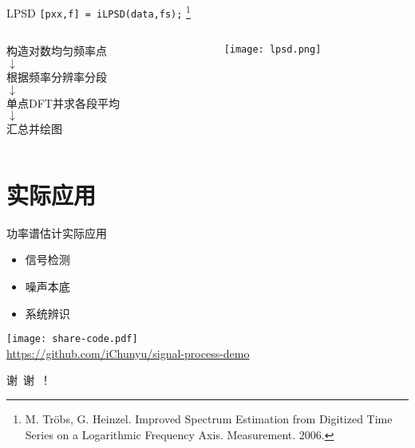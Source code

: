 \documentclass{beamer}
\begin{document}
\begin{frame}{LPSD}
    \small
    \texttt{[pxx,f] = iLPSD(data,fs);}
    \footnote{M. Tröbs, G. Heinzel. Improved Spectrum Estimation from Digitized Time Series on a Logarithmic Frequency Axis. Measurement. 2006.
    }
    \vspace{\fill}
    \begin{columns}
        \begin{column}{0.4\textwidth}
            \centering\normalsize
            构造对数均匀频率点 \\
            $\downarrow$ \\
            根据频率分辨率分段 \\
            $\downarrow$ \\
            单点DFT并求各段平均 \\
            $\downarrow$ \\
            汇总并绘图
        \end{column}
        \begin{column}{0.6\textwidth}
            \centering
            \texttt{[image: lpsd.png]}
        \end{column}
    \end{columns}
\end{frame}


\section{实际应用}
\begin{frame}{功率谱估计实际应用}
    \begin{itemize}
        \item 信号检测
        \item 噪声本底
        \item 系统辨识
    \end{itemize}
    
    \hfill\texttt{[image: share-code.pdf]} \\
    \hfill\href{https://github.com/iChunyu/signal-process-demo}{\scriptsize https://github.com/iChunyu/signal-process-demo}
    
\end{frame}

\begin{frame}[standout]
     谢\ 谢\ ！
\end{frame}
\end{document}
